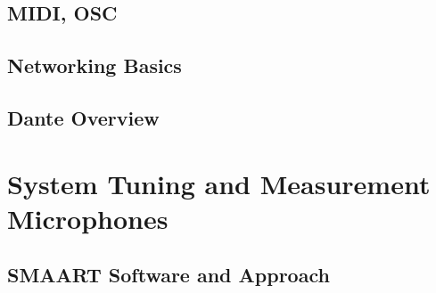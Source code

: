 \documentclass[a4paper]{article}
\begin{document}
\subsection{MIDI, OSC}

\subsection{Networking Basics}

\subsection{Dante Overview}

\section[System Tuning]{System Tuning and Measurement Microphones}

\subsection{SMAART Software and Approach}
\end{document}
